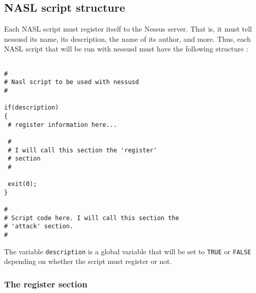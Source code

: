 \documentclass{article}
\begin{document}
\subsection{NASL script structure}

Each NASL script must register itself to the Nessus server. That is,
it must tell nessusd its name, its description, the name of its author, and
more. Thus, each NASL script that will be run with nessusd must have the
following structure :
\begin{verbatim}

#
# Nasl script to be used with nessusd
#

if(description)
{
 # register information here...
 
 #
 # I will call this section the 'register' 
 # section
 #
 
 exit(0);
}

#
# Script code here. I will call this section the
# 'attack' section.
#

\end{verbatim}


The variable \verb+description+ is a global variable that will be set to
\verb+TRUE+ or \verb+FALSE+ depending on whether the script must register or
not.

\subsubsection{The register section}
\end{document}
